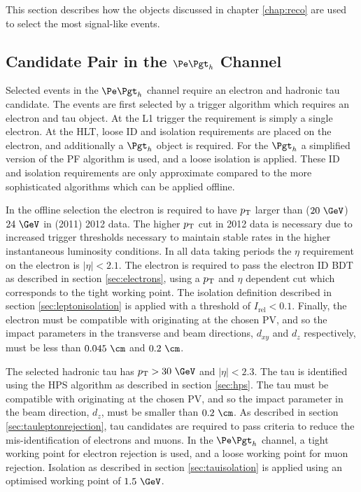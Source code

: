 This section describes how the objects discussed in chapter
\ref{chap:reco} are used to select the most signal-like events. 

\subsection{Candidate Pair in the $\etau$ Channel}

Selected events in the $\etau$ channel require an electron and hadronic tau
candidate. The events are first selected by a trigger algorithm which requires
an electron and tau object. At the \ac{L1} trigger the requirement is simply a
single electron. At the \ac{HLT}, loose ID and isolation requirements are placed on the
electron, and additionally a $\Pgth$ object is required. For
the $\Pgth$ a simplified version of the \ac{PF} algorithm is used, and a loose
isolation is applied. These ID and isolation requirements are only approximate
compared to the more sophisticated algorithms which can be applied offline.  

In the offline selection the electron is required to have $p_{\mathrm{T}}$ larger than ($20~\GeV$)
$24~\GeV$ in (2011) 2012 data. The higher $p_{\mathrm{T}}$ cut in 2012 data is necessary
due to increased trigger thresholds necessary to maintain stable rates in the
higher instantaneous luminosity conditions. In all data taking periods the $\eta$ requirement
on the electron is $|\eta| < 2.1$. The electron is required to pass the electron
ID \ac{BDT} as described in section \ref{sec:electrons}, using a $p_{\mathrm{T}}$ and
$\eta$ dependent cut which corresponds to the tight working point.  
The isolation definition described in section \ref{sec:leptonisolation} is
applied with a threshold of $I_{\text{rel}} < 0.1$. Finally, the electron must be compatible with
originating at the chosen \ac{PV}, and so the impact parameters in the
transverse and beam directions, $d_{xy}$ and $d_{z}$ respectively, must be 
less than $0.045~\cm$ and $0.2~\cm$. 

The selected hadronic tau has $\pt > 30~\GeV$ and $|\eta|<2.3$. 
The tau is identified using the \ac{HPS} algorithm as described in 
section \ref{sec:hps}. The tau must be compatible with
originating at the chosen \ac{PV}, and so the impact parameter in the beam
direction, $d_{z}$, must be smaller than $0.2~\cm$. 
As described in section \ref{sec:tauleptonrejection}, 
tau candidates are required to pass criteria to reduce the mis-identification of electrons and
muons. In the $\etau$ channel, a tight working point for electron rejection is
used, and a loose working point for muon rejection. Isolation as described in
section \ref{sec:tauisolation} is applied using an optimised working point of
$1.5~\GeV$.  

